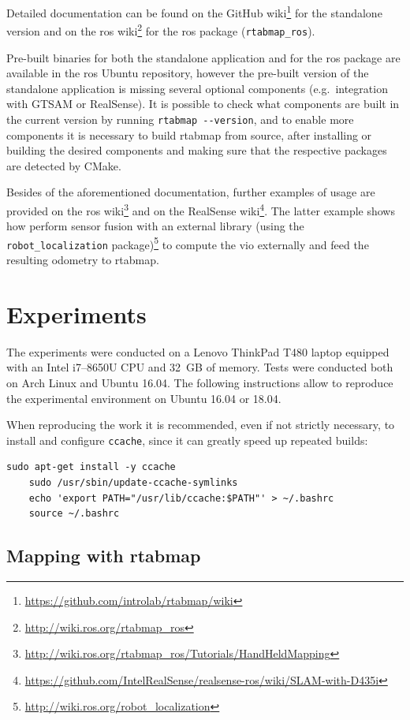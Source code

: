 \documentclass[11pt, letterpaper, twoside]{article}
\begin{document}
Detailed documentation can be found on the GitHub
wiki\footnote{\url{https://github.com/introlab/rtabmap/wiki}} for the
standalone version and on the \gls{ros}
wiki\footnote{\url{http://wiki.ros.org/rtabmap_ros}} for the \gls{ros} package
(\texttt{rtabmap\_ros}).

Pre-built binaries for both the standalone application and for the \gls{ros}
package are available in the \gls{ros} Ubuntu repository, however the pre-built
version of the standalone application is missing several optional components
(e.g.~integration with GTSAM or RealSense). It is possible to check what
components are built in the current version by running \texttt{rtabmap
-{}-version}, and to enable more components it is necessary to build
\gls{rtabmap} from source, after installing or building the desired components
and making sure that the respective packages are detected by CMake.

Besides of the aforementioned documentation, further examples of usage are
provided on the \gls{ros}
wiki\footnote{\url{http://wiki.ros.org/rtabmap_ros/Tutorials/HandHeldMapping}}
and on the RealSense
wiki\footnote{\url{https://github.com/IntelRealSense/realsense-ros/wiki/SLAM-with-D435i}}.
The latter example shows how perform sensor fusion with an external library
(using the \texttt{robot\_localization}
package)\footnote{\url{http://wiki.ros.org/robot_localization}} to compute the
\gls{vio} externally and feed the resulting odometry to \gls{rtabmap}.

\section{Experiments}

The experiments were conducted on a Lenovo ThinkPad T480 laptop equipped with
an Intel i7--8650U CPU and 32~GB of memory. Tests were conducted both on Arch
Linux and Ubuntu 16.04. The following instructions allow to reproduce the
experimental environment on Ubuntu 16.04 or 18.04.

When reproducing the work it is recommended, even if not strictly necessary, to
install and configure \texttt{ccache}, since it can greatly speed up repeated
builds:
\begin{Verbatim}[samepage=true]
    sudo apt-get install -y ccache
    sudo /usr/sbin/update-ccache-symlinks
    echo 'export PATH="/usr/lib/ccache:$PATH"' > ~/.bashrc
    source ~/.bashrc
\end{Verbatim}

\subsection{Mapping with \acs{rtabmap}}\label{sec:rtabmap-setup}
\end{document}
